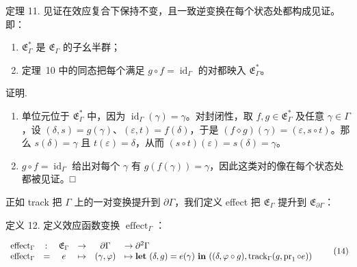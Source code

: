 \documentclass[
  10
]{article}
\begin{document}
定理 11. 见证在效应复合下保持不变，且一致逆变换在每个状态处都构成见证。即：

\begin{enumerate}
\def\labelenumi{\arabic{enumi}.}
\item
  \(\mathfrak { E } _ { \Gamma } ^ { * }\) 是 \(\mathfrak { E } _ { \Gamma }\) 的子幺半群；
\item
  定理~10 中的同态把每个满足 \(g \circ f = \operatorname { i d } _ { \Gamma }\) 的对都映入
  \(\mathfrak { E } _ { \Gamma } ^ { * }\)。
\end{enumerate}

证明.

\begin{enumerate}
\def\labelenumi{\arabic{enumi}.}
\item
  单位元位于 \(\mathfrak { E } _ { \Gamma } ^ { * }\) 中，因为
  \(\operatorname { i d } _ { \Gamma } ( \gamma ) = \gamma\)。对封闭性，取
  \(f , g \in \mathfrak { E } _ { \Gamma } ^ { * }\) 及任意 \(\gamma \in \Gamma\)，设
  \(( \delta , s ) = g ( \gamma )\)、\(( \varepsilon , t ) = f ( \delta )\)，于是
  \(( f \diamond g ) ( \gamma ) = ( \varepsilon , s \circ t )\)。那么
  \(s ( \delta ) = \gamma\) 且 \(t ( \varepsilon ) = \delta\)，从而
  \(( s \circ t ) ( \varepsilon ) = s ( \delta ) = \gamma\)。
\item
  \(g \circ f = \operatorname { i d } _ { \Gamma }\) 给出对每个 \(\gamma\) 有
  \(g ( f ( \gamma ) ) = \gamma\)，因此这类对的像在每个状态处都被见证。□
\end{enumerate}

正如 track 把 $\Gamma$ 上的一对变换提升到 \(\partial \Gamma\)，我们定义 effect 把
\(\mathfrak { E } _ { \Gamma }\) 提升到 \(\mathfrak { E } _ { \partial \Gamma }\)：

定义 12. 定义效应函数变换 \(\operatorname { e f f e c t } _ { \Gamma }\)：

\[
\begin{array} { l r c l c l }
  { \operatorname { e f f e c t } _ { \Gamma } } & { \colon } & { \mathfrak { E } _ { \Gamma } } & { \to } & { \partial \Gamma } & { \to \partial ^ { 2 } \Gamma } \\
  { \operatorname { e f f e c t } _ { \Gamma } } & { = } & { e } & { \mapsto } & { ( \gamma , \varphi ) } & { \mapsto \mathbf { l e t } \ ( \delta , g ) = e ( \gamma ) \ \mathbf { i n } \ ( ( \delta , \varphi \circ g ) , \operatorname { t r a c k } _ { \Gamma } ( g , \operatorname { p r } _ { 1 } \circ e ) ) }
\end{array}\tag{14}
\]
\end{document}
